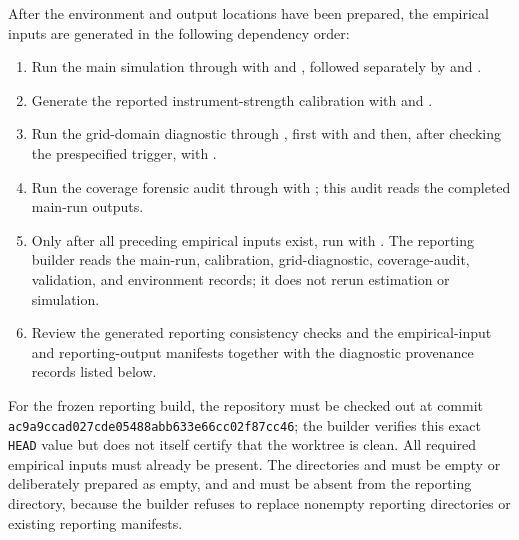 After the environment and output locations have been prepared, the empirical inputs are generated in the following dependency order:
\begin{enumerate}
    \item Run the main simulation through  with  and , followed separately by  and .
    \item Generate the reported instrument-strength calibration with  and .
    \item Run the grid-domain diagnostic through , first with  and then, after checking the prespecified trigger, with .
    \item Run the coverage forensic audit through  with ; this audit reads the completed main-run outputs.
    \item Only after all preceding empirical inputs exist, run  with . The reporting builder reads the main-run, calibration, grid-diagnostic, coverage-audit, validation, and environment records; it does not rerun estimation or simulation.
    \item Review the generated reporting consistency checks and the empirical-input and reporting-output manifests together with the diagnostic provenance records listed below.
\end{enumerate}

For the frozen reporting build, the repository must be checked out at commit \texttt{ac9a9ccad027cde05488abb633e66cc02f87cc46}; the builder verifies this exact \texttt{HEAD} value but does not itself certify that the worktree is clean. All required empirical inputs must already be present. The directories  and  must be empty or deliberately prepared as empty, and  and  must be absent from the reporting directory, because the builder refuses to replace nonempty reporting directories or existing reporting manifests.

